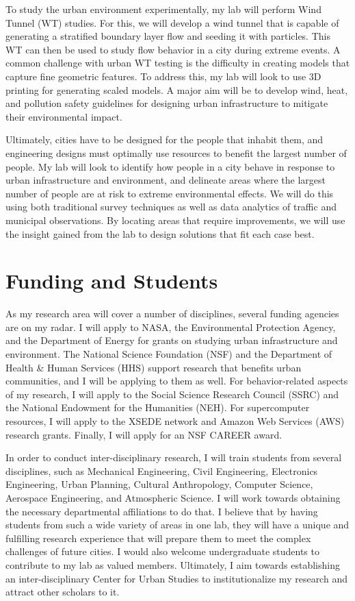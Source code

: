 \documentclass[12pt]{article}
\begin{document}
To study the urban environment experimentally, my lab will perform Wind Tunnel (WT) studies. For this, we will develop a wind tunnel that is capable of generating a stratified boundary layer flow and seeding it with particles. This WT can then be used to study flow behavior in a city during extreme events. A common challenge with urban WT testing is the difficulty in creating models that capture fine geometric features. To address this, my lab will look to use 3D printing for generating scaled models. A major aim will be to develop wind, heat, and pollution safety guidelines for designing urban infrastructure to mitigate their environmental impact. 

Ultimately, cities have to be designed for the people that inhabit them, and engineering designs must optimally use resources to benefit the largest number of people. My lab will look to identify how people in a city behave in response to urban infrastructure and environment, and delineate areas where the largest number of people are at risk to extreme environmental effects. We will do this using both traditional survey techniques as well as data analytics of traffic and municipal observations. By locating areas that require improvements, we will use the insight gained from the lab to design solutions that fit each case best. 

\section*{Funding and Students}
As my research area will cover a number of disciplines, several funding agencies are on my radar. I will apply to NASA, the Environmental Protection Agency, and the Department of Energy for grants on studying urban infrastructure and environment. The National Science Foundation (NSF) and the Department of Health \& Human Services (HHS) support research that benefits urban communities, and I will be applying to them as well. For behavior-related aspects of my research, I will apply to the Social Science Research Council (SSRC) and the National Endowment for the Humanities (NEH). For supercomputer resources, I will apply to the XSEDE network and Amazon Web Services (AWS) research grants. Finally, I will apply for an NSF CAREER award.

In order to conduct inter-disciplinary research, I will train students from several disciplines, such as Mechanical Engineering, Civil Engineering, Electronics Engineering, Urban Planning, Cultural Anthropology, Computer Science, Aerospace Engineering, and Atmospheric Science. I will work towards obtaining the necessary departmental affiliations to do that. I believe that by having students from such a wide variety of areas in one lab, they will have a unique and fulfilling research experience that will prepare them to meet the complex challenges of future cities. I would also welcome undergraduate students to contribute to my lab as valued members. Ultimately, I aim towards establishing an inter-disciplinary Center for Urban Studies to institutionalize my research and attract other scholars to it.

 

\end{document}
